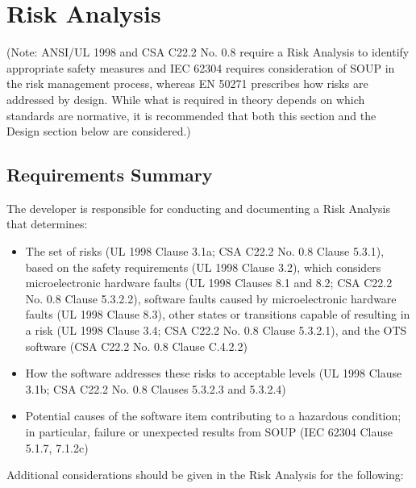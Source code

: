 \documentclass[12pt]{../Common_files/ElisaPaper}
\begin{document}
\section{Risk Analysis}
(Note: ANSI/UL 1998 \cite{UL1998} and CSA C22.2 No. 0.8 \cite{CSA0.8} require a Risk Analysis to identify appropriate safety measures and IEC 62304 \cite{IEC62304} requires consideration of SOUP in the risk management process, whereas EN 50271 \cite{EN50271} prescribes how risks are addressed by design.  While what is required in theory depends on which standards are normative, it is recommended that both this section and the Design section below are considered.)

\subsection{Requirements Summary}
The developer is responsible for conducting and documenting a Risk Analysis that determines:

\begin{itemize}

\item The set of risks (UL 1998 \cite{UL1998} Clause 3.1a; CSA C22.2 No. 0.8 \cite{CSA0.8} Clause 5.3.1), based on the safety requirements (UL 1998 \cite{UL1998} Clause 3.2), which considers microelectronic hardware faults (UL 1998 \cite{UL1998} Clauses 8.1 and 8.2; CSA C22.2 No. 0.8 \cite{CSA0.8} Clause 5.3.2.2), software faults caused by microelectronic hardware faults (UL 1998 \cite{UL1998} Clause 8.3), other states or transitions capable of resulting in a risk (UL 1998 \cite{UL1998} Clause 3.4; CSA C22.2 No. 0.8 \cite{CSA0.8} Clause 5.3.2.1), and the OTS software (CSA C22.2 No. 0.8 \cite{CSA0.8} Clause C.4.2.2)

\item How the software addresses these risks to acceptable levels (UL 1998 \cite{UL1998} Clause 3.1b; CSA C22.2 No. 0.8 \cite{CSA0.8} Clauses 5.3.2.3 and 5.3.2.4)

\item Potential causes of the software item contributing to a hazardous condition; in particular, failure or unexpected results from SOUP (IEC 62304 \cite{IEC62304} Clause 5.1.7, 7.1.2c)

\end{itemize}

Additional considerations should be given in the Risk Analysis for the following:
\end{document}
